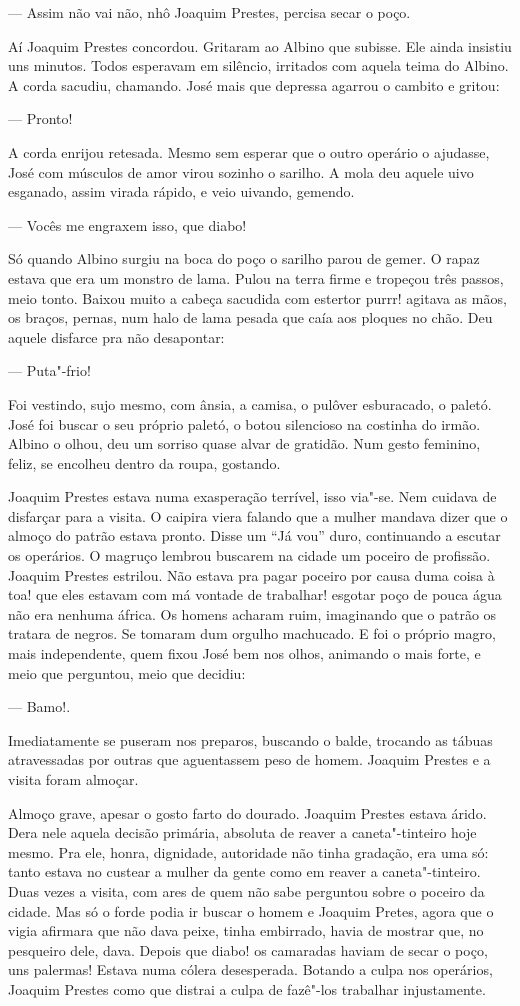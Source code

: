 --- Assim não vai não, nhô Joaquim Prestes, percisa secar o poço.

Aí Joaquim Prestes concordou. Gritaram ao Albino que subisse. Ele ainda
insistiu uns minutos. Todos esperavam em silêncio, irritados com aquela
teima do Albino. A corda sacudiu, chamando. José mais que depressa
agarrou o cambito e gritou:

--- Pronto!

A corda enrijou retesada. Mesmo sem esperar que o outro operário o
ajudasse, José com músculos de amor virou sozinho o sarilho. A mola deu
aquele uivo esganado, assim virada rápido, e veio uivando, gemendo.

--- Vocês me engraxem isso, que diabo!

Só quando Albino surgiu na boca do poço o sarilho parou de gemer. O
rapaz estava que era um monstro de lama. Pulou na terra firme e tropeçou
três passos, meio tonto. Baixou muito a cabeça sacudida com estertor
purrr! agitava as mãos, os braços, pernas, num halo de lama pesada que
caía aos ploques no chão. Deu aquele disfarce pra não desapontar:

--- Puta"-frio!

Foi vestindo, sujo mesmo, com ânsia, a camisa, o pulôver esburacado, o
paletó. José foi buscar o seu próprio paletó, o botou silencioso na
costinha do irmão. Albino o olhou, deu um sorriso quase alvar de
gratidão. Num gesto feminino, feliz, se encolheu dentro da roupa,
gostando.

Joaquim Prestes estava numa exasperação terrível, isso via"-se. Nem
cuidava de disfarçar para a visita. O caipira viera falando que a mulher
mandava dizer que o almoço do patrão estava pronto. Disse um ``Já vou''
duro, continuando a escutar os operários. O magruço lembrou buscarem na
cidade um poceiro de profissão. Joaquim Prestes estrilou. Não estava pra
pagar poceiro por causa duma coisa à toa! que eles estavam com má
vontade de trabalhar! esgotar poço de pouca água não era nenhuma áfrica.
Os homens acharam ruim, imaginando que o patrão os tratara de negros. Se
tomaram dum orgulho machucado. E foi o próprio magro, mais independente,
quem fixou José bem nos olhos, animando o mais forte, e meio que
perguntou, meio que decidiu:

--- Bamo!.

Imediatamente se puseram nos preparos, buscando o balde, trocando as
tábuas atravessadas por outras que aguentassem peso de homem. Joaquim
Prestes e a visita foram almoçar.

Almoço grave, apesar o gosto farto do dourado. Joaquim Prestes estava
árido. Dera nele aquela decisão primária, absoluta de reaver a
caneta"-tinteiro hoje mesmo. Pra ele, honra, dignidade, autoridade não
tinha gradação, era uma só: tanto estava no custear a mulher da gente
como em reaver a caneta"-tinteiro. Duas vezes a visita, com ares de quem
não sabe perguntou sobre o poceiro da cidade. Mas só o forde podia ir
buscar o homem e Joaquim Pretes, agora que o vigia afirmara que não dava
peixe, tinha embirrado, havia de mostrar que, no pesqueiro dele, dava.
Depois que diabo! os camaradas haviam de secar o poço, uns palermas!
Estava numa cólera desesperada. Botando a culpa nos operários, Joaquim
Prestes como que distrai a culpa de fazê"-los trabalhar injustamente.

